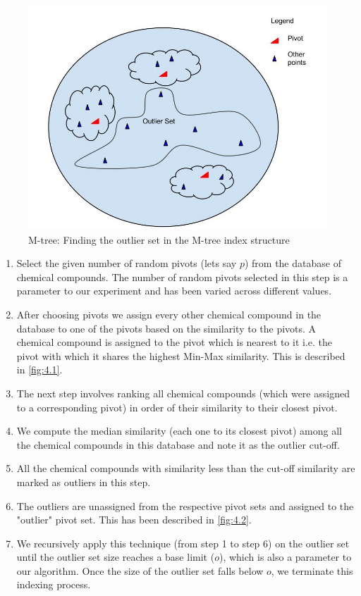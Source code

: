 \begin{figure}[ht]	
\centering
\includegraphics[width=0.7 \columnwidth]{img/image0b.jpg}
\caption{M-tree: Finding the outlier set in the M-tree index structure}
\label{fig:4.2}
\end{figure}
\begin{enumerate}

\item Select the given number of random pivots (lets say $p$) from the database of chemical compounds. The number of random pivots selected in this step is a parameter to our experiment and has been varied across different values.

\item After choosing pivots we assign every other chemical compound in the database to one of the pivots based on the similarity to the pivots. A chemical compound is assigned to the pivot which is nearest to it i.e. the pivot with which it shares the highest Min-Max similarity. This is described in \autoref{fig:4.1}.

\item The next step involves ranking all chemical compounds (which were assigned to a corresponding pivot) in order of their similarity to their closest pivot. 

\item We compute the median similarity (each one to its closest pivot) among all the chemical compounds in this database and note it as the outlier cut-off.

\item All the chemical compounds with similarity less than the cut-off similarity are marked as outliers in this step.

\item The outliers are unassigned from the respective pivot sets and assigned to the "outlier" pivot set. This has been described in \autoref{fig:4.2}.

\item We recursively apply this technique (from step 1 to step 6) on the outlier set until the outlier set size reaches a base limit ($o$), which is also a parameter to our algorithm. Once the size of the outlier set falls below $o$, we terminate this indexing process. \\

\end{enumerate}


